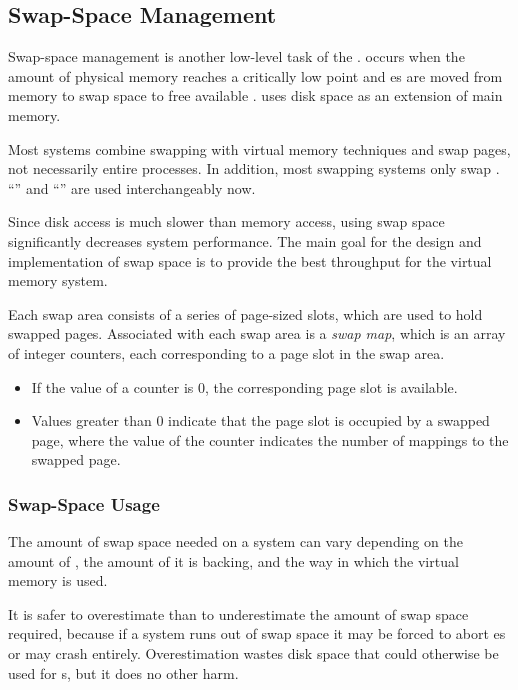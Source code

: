 \subsection{Swap-Space Management}\label{subsec:Swap_Space_Management}
Swap-space management is another low-level task of the .
 occurs when the amount of physical memory reaches a critically low point and es are moved from memory to swap space to free available .
 uses disk space as an extension of main memory.

Most systems combine swapping with virtual memory techniques and swap pages, not necessarily entire processes.
In addition, most swapping systems only swap .
``'' and ``'' are used interchangeably now.

Since disk access is much slower than memory access, using swap space significantly decreases system performance.
The main goal for the design and implementation of swap space is to provide the best throughput for the virtual memory system.

Each swap area consists of a series of page-sized slots, which are used to hold swapped pages.
Associated with each swap area is a \emph{swap map}, which is an array of integer counters, each corresponding to a page slot in the swap area.
\begin{itemize}[noitemsep]
\item If the value of a counter is 0, the corresponding page slot is available.
\item Values greater than 0 indicate that the page slot is occupied by a swapped page, where the value of the counter indicates the number of mappings to the swapped page.
\end{itemize}

\subsubsection{Swap-Space Usage}\label{subsubsec:Swap_Space_Usage}
The amount of swap space needed on a system can vary depending on the amount of , the amount of  it is backing, and the way in which the virtual memory is used.

It is safer to overestimate than to underestimate the amount of swap space required, because if a system runs out of swap space it may be forced to abort es or may crash entirely.
Overestimation wastes disk space that could otherwise be used for s, but it does no other harm.

